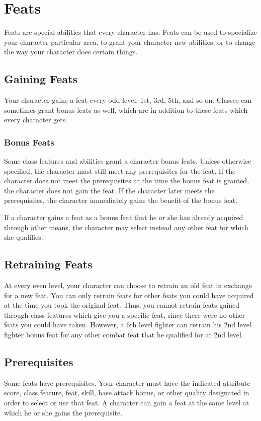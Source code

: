 \chapter{Feats}\label{Feats}
Feats are special abilities that every character has. Feats can be used to specialize your character particular area, to grant your character new abilities, or to change the way your character does certain things.

\section{Gaining Feats}
Your character gains a feat every odd level: 1st, 3rd, 5th, and so on. Classes can sometimes grant bonus feats as well, which are in addition to these feats which every character gets.

\subsection{Bonus Feats}
Some class features and abilities grant a character bonus feats. Unless otherwise specified, the character must still meet any prerequisites for the feat. If the character does not meet the prerequisites at the time the bonus feat is granted, the character does not gain the feat. If the character later meets the prerequisites, the character immediately gains the benefit of the bonus feat.

If a character gains a feat as a bonus feat that he or she has already acquired through other means, the character may select instead any other feat for which she qualifies.

\section{Retraining Feats}
At every even level, your character can choose to retrain an old feat in exchange for a new feat. You can only retrain feats for other feats you could have acquired at the time you took the original feat. Thus, you cannot retrain feats gained through class features which give you a specific feat, since there were no other feats you could have taken. However, a 6th level fighter can retrain his 2nd level fighter bonus feat for any other combat feat that he qualified for at 2nd level.

\section{Prerequisites}
Some feats have prerequisites. Your character must have the indicated attribute score, class feature, feat, skill, base attack bonus, or other quality designated in order to select or use that feat. A character can gain a feat at the same level at which he or she gains the prerequisite.

